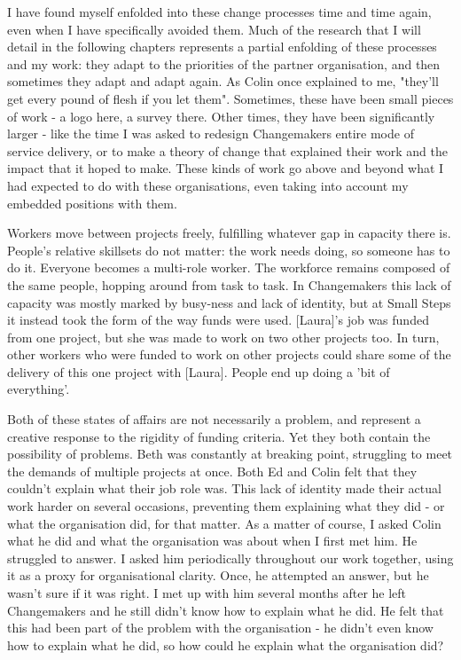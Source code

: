 I have found myself enfolded into these change processes time and time again, even when I have specifically avoided them. Much of the research that I will detail in the following chapters represents a partial enfolding of these processes and my work: they adapt to the priorities of the partner organisation, and then sometimes they adapt and adapt again. As Colin once explained to me, "they'll get every pound of flesh if you let them". Sometimes, these have been small pieces of work - a logo here, a survey there. Other times, they have been significantly larger - like the time I was asked to redesign Changemakers entire mode of service delivery, or to make a theory of change that explained their work and the impact that it hoped to make. These kinds of work go above and beyond what I had expected to do with these organisations, even taking into account my embedded positions with them.

Workers move between projects freely, fulfilling whatever gap in capacity there is. People's relative skillsets do not matter: the work needs doing, so someone has to do it. Everyone becomes a multi-role worker. The workforce remains composed of the same people, hopping around from task to task. In Changemakers this lack of capacity was mostly marked by busy-ness and lack of identity, but at Small Steps it instead took the form of the way funds were used. [Laura]'s job was funded from one project, but she was made to work on two other projects too. In turn, other workers who were funded to work on other projects could share some of the delivery of this one project with [Laura]. People end up doing a 'bit of everything'.

Both of these states of affairs are not necessarily a problem, and represent a creative response to the rigidity of funding criteria. Yet they both contain the possibility of problems. Beth was constantly at breaking point, struggling to meet the demands of multiple projects at once. Both Ed and Colin felt that they couldn't explain what their job role was. This lack of identity made their actual work harder on several occasions, preventing them explaining what they did - or what the organisation did, for that matter. As a matter of course, I asked Colin what he did and what the organisation was about when I first met him. He struggled to answer. I asked him periodically throughout our work together, using it as a proxy for organisational clarity. Once, he attempted an answer, but he wasn't sure if it was right. I met up with him several months after he left Changemakers and he still didn't know how to explain what he did. He felt that this had been part of the problem with the organisation - he didn't even know how to explain what he did, so how could he explain what the organisation did?


